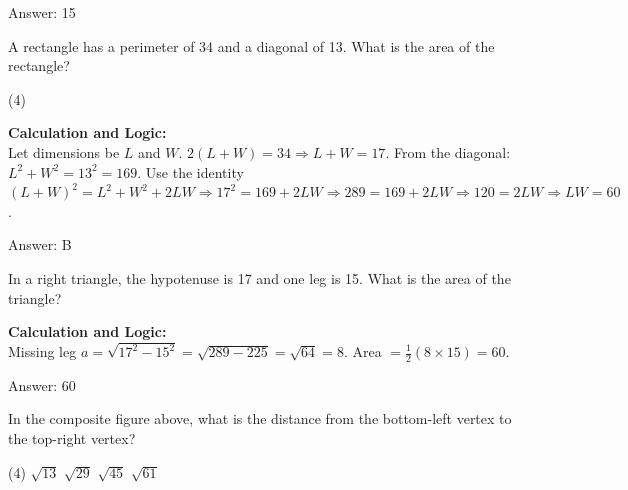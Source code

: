 \documentclass[11pt,paper=a4,answers]{exam}
\begin{document}
\begin{questions}
\begin{solution}
\vspace{30pt}

Answer: \colorbox{yellow!100}{15}
\end{solution}

\vspace{60pt}

\question
A rectangle has a perimeter of 34 and a diagonal of 13. What is the area of the rectangle?
\begin{tasks}(4)
\end{tasks}

\begin{solution}
\textbf{Calculation and Logic:} \\
Let dimensions be $L$ and $W$. $2(L+W) = 34 \Rightarrow L+W = 17$. From the diagonal: $L^2 + W^2 = 13^2 = 169$. Use the identity $(L+W)^2 = L^2 + W^2 + 2LW \Rightarrow 17^2 = 169 + 2LW \Rightarrow 289 = 169 + 2LW \Rightarrow 120 = 2LW \Rightarrow LW = 60$.

\vspace{30pt}

Answer: \colorbox{yellow!100}{B}
\end{solution}

\vspace{60pt}

\question
In a right triangle, the hypotenuse is 17 and one leg is 15. What is the area of the triangle?

\begin{solution}
\textbf{Calculation and Logic:} \\
Missing leg $a = \sqrt{17^2 - 15^2} = \sqrt{289 - 225} = \sqrt{64} = 8$. Area $= \frac{1}{2}(8 \times 15) = 60$.

\vspace{30pt}

Answer: \colorbox{yellow!100}{60}
\end{solution}

\vspace{60pt}

\question
\begin{center}
\end{center}
In the composite figure above, what is the distance from the bottom-left vertex to the top-right vertex?
\begin{tasks}(4)
    \task $\sqrt{13}$
    \task $\sqrt{29}$
    \task $\sqrt{45}$
    \task $\sqrt{61}$
\end{tasks}


\end{questions}
\end{document}
